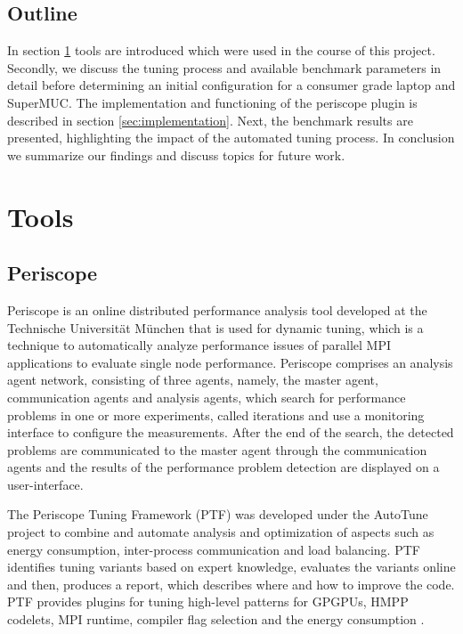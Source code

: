 \documentclass[10pt,twocolumn]{article}
\begin{document}
\subsection{Outline}
In section \ref{sec:tools} tools are introduced which were used in the course of this project. Secondly, we discuss the tuning process and available benchmark parameters in detail before determining an initial configuration for a consumer grade laptop and SuperMUC. The implementation and functioning of the periscope plugin is described in section \ref{sec:implementation}. Next, the benchmark results are presented, highlighting the impact of the automated tuning process. In conclusion we summarize our findings and discuss topics for future work.

\section{Tools}
\label{sec:tools}


\subsection{Periscope}
Periscope is an online distributed performance analysis tool\cite{tibidabo} developed at the Technische Universit\"at M\"unchen that is used for dynamic tuning, which is a technique to automatically analyze performance issues of parallel MPI applications to evaluate single node performance\cite{tibidabo}. Periscope comprises an analysis agent network, consisting of three agents, namely, the master agent, communication agents and analysis agents, which search for performance problems in one or more experiments, called iterations and use a monitoring interface to conﬁgure the measurements. After the end of the search, the detected problems are communicated to the master agent through the communication agents and the results of the performance problem detection are displayed on a user-interface.


The Periscope Tuning Framework (PTF) was developed under the AutoTune project \cite{apsc} to combine and automate analysis and optimization of aspects such as energy consumption, inter-process communication and load balancing. PTF identiﬁes tuning variants based on expert knowledge, evaluates the variants online and then, produces a report, which describes where and how to improve the code. PTF provides plugins for tuning high-level patterns for GPGPUs, HMPP codelets, MPI runtime, compiler flag selection and the energy consumption \cite{apsc}. 
\end{document}
